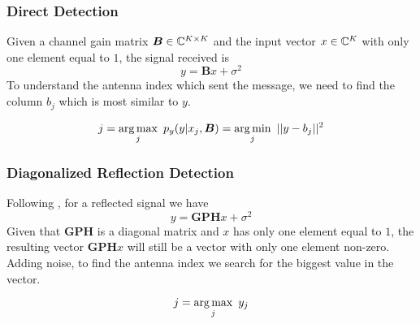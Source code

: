 \subsubsection{Direct Detection}
Given a channel gain matrix $\bm{B} \in \mathbb{C}^{K \times K}$ and the input vector $x \in \mathbb{C}^K$ with only one element equal to $1$, the signal received is
\begin{equation}
  y = \bm{B}x + \sigma^2
\end{equation}
To understand the antenna index which sent the message, we need to find the column $b_j$ which is most similar to $y$.

\begin{equation}
  j = \operatorname*{arg\,max}_j\ p_y (y | x_j, \bm{B}) = \operatorname*{arg\,min}_j\ || y - b_j ||^2
  \label{eq:direct_detection}
\end{equation}

\subsubsection{Diagonalized Reflection Detection}
Following \cite{9328149}, for a reflected signal we have
\begin{equation}
  y = \bm{GPH}x + \sigma^2
\end{equation}
Given that $\bm{GPH}$ is a diagonal matrix and $x$ has only one element equal to $1$, the resulting vector $\bm{GPH}x$ will still be a vector with only one element non-zero. Adding noise, to find the antenna index we search for the biggest value in the vector.

\begin{equation}
  j = \operatorname*{arg\,max}_j\ y_j
  \label{eq:reflection_detection}
\end{equation}